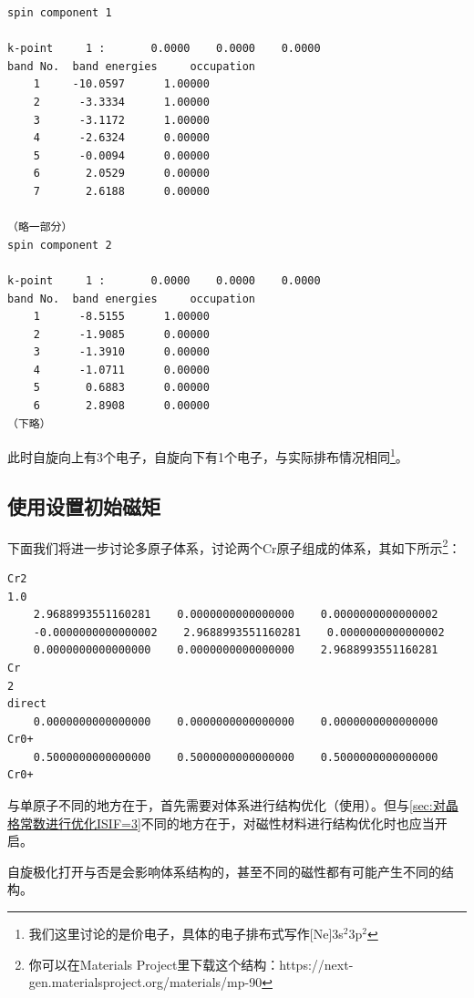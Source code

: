 \begin{lstlisting}[caption=OUTCAR]
spin component 1

k-point     1 :       0.0000    0.0000    0.0000
band No.  band energies     occupation
    1     -10.0597      1.00000
    2      -3.3334      1.00000
    3      -3.1172      1.00000
    4      -2.6324      0.00000
    5      -0.0094      0.00000
    6       2.0529      0.00000
    7       2.6188      0.00000

（略一部分）
spin component 2

k-point     1 :       0.0000    0.0000    0.0000
band No.  band energies     occupation
    1      -8.5155      1.00000
    2      -1.9085      0.00000
    3      -1.3910      0.00000
    4      -1.0711      0.00000
    5       0.6883      0.00000
    6       2.8908      0.00000
（下略）
\end{lstlisting}

此时自旋向上有3个电子，自旋向下有1个电子，与实际排布情况相同\footnote{我们这里讨论的是价电子，具体的电子排布式写作[Ne]3s$^2$3p$^2$}。

\subsection{使用设置初始磁矩}\label{subsec:磁矩计算-使用MAGMOM设置初始磁矩}

下面我们将进一步讨论多原子体系，讨论两个Cr原子组成的体系，其如下所示\footnote{你可以在Materials Project里下载这个结构：https://next-gen.materialsproject.org/materials/mp-90}：

\begin{lstlisting}[caption=POSCAR]
Cr2
1.0
    2.9688993551160281    0.0000000000000000    0.0000000000000002
    -0.0000000000000002    2.9688993551160281    0.0000000000000002
    0.0000000000000000    0.0000000000000000    2.9688993551160281
Cr
2
direct
    0.0000000000000000    0.0000000000000000    0.0000000000000000 Cr0+
    0.5000000000000000    0.5000000000000000    0.5000000000000000 Cr0+
\end{lstlisting}

与单原子不同的地方在于，首先需要对体系进行结构优化（使用）。但与\ref{sec:对晶格常数进行优化ISIF=3}不同的地方在于，对磁性材料进行结构优化时也应当开启。

\begin{attention}
    自旋极化打开与否是会影响体系结构的，甚至不同的磁性都有可能产生不同的结构。
\end{attention}

